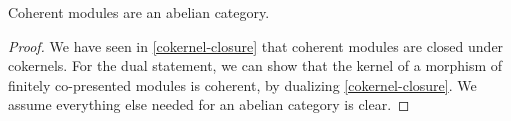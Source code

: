 \begin{theorem}
  Coherent modules are an abelian category.
\end{theorem}

\begin{proof}
  We have seen in \cref{cokernel-closure} that coherent modules are closed under cokernels.
  For the dual statement, we can show that the kernel of a morphism of finitely co-presented modules
  is coherent, by dualizing \cref{cokernel-closure}.
  We assume everything else needed for an abelian category is clear.
\end{proof}
